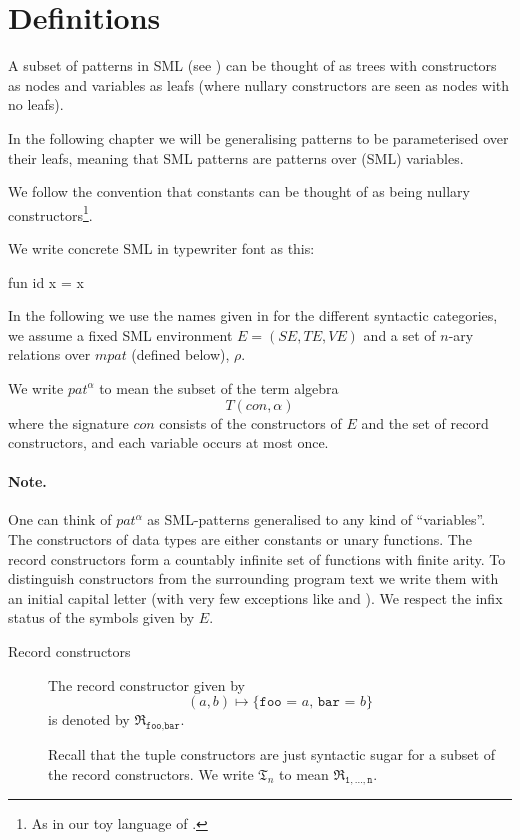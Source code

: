 \section{Definitions}\label{sec:definitions}
A subset of patterns in SML (see ) can be thought of as
trees with constructors as nodes and variables as leafs (where nullary
constructors are seen as nodes with no leafs).

In the following chapter we will be generalising patterns to be parameterised
over their leafs, meaning that SML patterns are patterns over (SML) variables.

We follow the convention that constants can be thought of as being nullary
constructors\footnote{As in our toy language of
  .}.

We write concrete SML in typewriter font as this:
\begin{sml}
fun id x = x
\end{sml}

In the following we use the names given in \cite{SML97} for the different
syntactic categories, we assume a fixed SML environment $E = (S\!E, T\!E, V\!E)$
and a set of $n$-ary relations over $mpat$ (defined below), $\rho$.

\begin{definition}
  We write $pat^\alpha$ to mean the subset of the term algebra
  \[
  T(con, \alpha)
  \]
  where the signature $con$ consists of the constructors of $E$ and the set of
  record constructors, and each variable occurs at most once.
\end{definition}

\paragraph{Note.} One can think of $pat^\alpha$ as SML-patterns generalised to
any kind of ``variables''. The constructors of data types are either constants or
unary functions. The record constructors form a countably infinite set of
functions with finite arity. To distinguish constructors from the surrounding
program text we write them with an initial capital letter (with very few
exceptions like \codeinline{::} and ). We respect the infix
status of the symbols given by $E$.

\begin{description}
\item[Record constructors] The record constructor given by
  \[
  (a, b) \mapsto \texttt{\{foo = $a$, bar = $b$\}}
  \]
  is denoted by $\mathfrak{R}_{\texttt{foo},\texttt{bar}}$.

  Recall that the tuple constructors are just syntactic sugar for a subset of
  the record constructors. We write $\mathfrak{T}_n$ to mean
  $\mathfrak{R}_{\texttt{1},\ldots,\texttt{n}}$.
\end{description}

